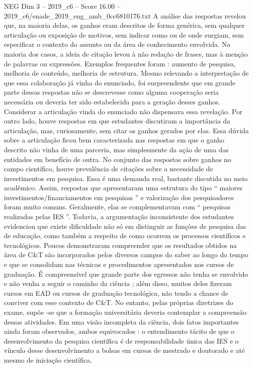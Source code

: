 \begin{textsample}{NEG Dim 3 – 2019\_c6 – Score 16.00 – 2019\_c6/enade\_2019\_eng\_amb\_0cc6810176.txt}
A análise das respostas revelou que, na maioria delas, os ganhos eram descritos de forma genérica, sem qualquer articulação ou exposição de motivos, sem indicar como ou de onde surgiam, sem especificar o contexto do assunto ou da área de conhecimento envolvida.
Na maioria dos casos, a ideia de citação levou à não redação de frases, mas à menção de palavras ou expressões.
Exemplos frequentes foram : aumento de pesquisa, melhoria de conteúdo, melhoria de estrutura.
Mesmo relevando a interpretação de que essa colaboração já vinha do enunciado, foi surpreendente que em grande parte dessas respostas não se descrevesse como alguma cooperação seria necessária ou deveria ter sido estabelecida para a geração desses ganhos.
Considerar a articulação vinda do enunciado não dispensava essa revelação.
Por outro lado, houve respostas em que estudantes discutiram a importância da articulação, mas, curiosamente, sem citar os ganhos gerados por elas.
Essa dúvida sobre a articulação ficou bem caracterizada nas respostas em que o ganho descrito não vinha de uma parceria, mas simplesmente da ação de uma das entidades em benefício de outra.
No conjunto das respostas sobre ganhos no campo científico, houve prevalência de citações sobre a necessidade de investimentos em pesquisa.
Essa é uma demanda real, bastante discutida no meio acadêmico.
Assim, respostas que apresentaram uma estrutura do tipo “ maiores investimentos/financiamentos em pesquisas ” e valorização dos pesquisadores foram muito comuns.
Geralmente, elas se complementavam com “ pesquisas realizadas pelas IES ”.
Todavia, a argumentação inconsistente dos estudantes evidenciou que existe dificuldade não só em distinguir as funções de pesquisa das de educação, como também a respeito de como ocorrem os processos científicos e tecnológicos.
Poucos demonstraram compreender que os resultados obtidos na área de C\&T são incorporados pelos diversos campos do saber ao longo do tempo e que se consolidam nas técnicas e procedimentos apresentados nos cursos de graduação.
É compreensível que grande parte dos egressos não tenha se envolvido e não venha a seguir o caminho da ciência ; além disso, muitos deles fizeram cursos em EAD ou cursos de graduação tecnológica, não tendo a chance de conviver com esse contexto de C\&T.
No entanto, pelas próprias diretrizes do exame, supõe -se que a formação universitária deveria contemplar a compreensão dessas atividades.
Em uma visão incompleta da ciência, dois fatos importantes ainda foram observados, ambos equivocados : o entendimento tácito de que o desenvolvimento da pesquisa científica é de responsabilidade única das IES e o vínculo desse desenvolvimento a bolsas em cursos de mestrado e doutorado e até mesmo de iniciação científica.

\end{textsample}
